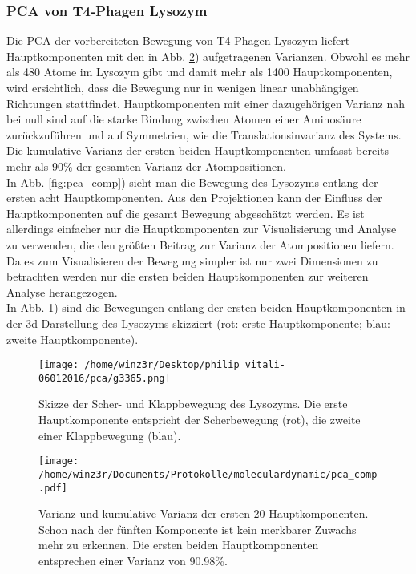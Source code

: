 \subsubsection{PCA von T4-Phagen Lysozym}
Die PCA der vorbereiteten Bewegung von T4-Phagen Lysozym liefert Hauptkomponenten mit den in Abb. \ref{fig:pca_val}) aufgetragenen Varianzen. Obwohl es mehr als 480 Atome im Lysozym gibt und damit mehr als 1400 Hauptkomponenten, wird ersichtlich, dass die Bewegung nur in wenigen linear unabhängigen Richtungen stattfindet. Hauptkomponenten mit einer dazugehörigen Varianz nah bei null sind auf die starke Bindung zwischen Atomen einer Aminosäure zurückzuführen und auf Symmetrien, wie die Translationsinvarianz des Systems.
Die kumulative Varianz der ersten beiden Hauptkomponenten umfasst bereits mehr als 90\% der gesamten Varianz der Atompositionen.
\\ \noindent
In Abb. \ref{fig:pca_comp}) sieht man die Bewegung des Lysozyms entlang der ersten acht Hauptkomponenten.
Aus den Projektionen kann der Einfluss der Hauptkomponenten auf die gesamt Bewegung abgeschätzt werden. Es ist allerdings einfacher nur die Hauptkomponenten zur Visualisierung und Analyse zu verwenden, die den größten Beitrag zur Varianz der Atompositionen liefern.
Da es zum Visualisieren der Bewegung simpler ist nur zwei Dimensionen zu betrachten werden nur die ersten beiden Hauptkomponenten zur weiteren Analyse herangezogen.
\\ \noindent
In Abb. \ref{fig:move}) sind die Bewegungen entlang der ersten beiden Hauptkomponenten in der 3d-Darstellung des Lysozyms skizziert (rot: erste Hauptkomponente; blau: zweite Hauptkomponente).
\begin{figure}
\centering
\texttt{[image: /home/winz3r/Desktop/philip\_vitali-06012016/pca/g3365.png]}\caption{Skizze der Scher- und Klappbewegung des Lysozyms. Die erste Hauptkomponente entspricht der Scherbewegung (rot), die zweite einer Klappbewegung (blau).}\label{fig:move}
\end{figure}

\begin{figure}
\centering
\texttt{[image: /home/winz3r/Documents/Protokolle/moleculardynamic/pca\_comp.pdf]}\caption{\centering Varianz und kumulative Varianz der ersten 20 Hauptkomponenten. Schon nach der fünften Komponente ist kein merkbarer Zuwachs mehr zu erkennen. Die ersten beiden Hauptkomponenten entsprechen einer Varianz von 90.98\%.}\label{fig:pca_val}
\end{figure}

